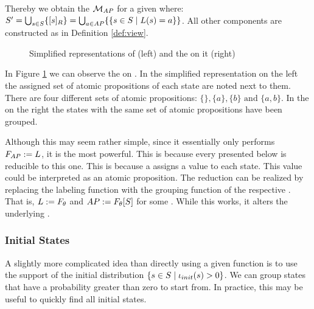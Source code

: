 \documentclass[preview]{standalone}
\begin{document}
Thereby we obtain the \viewN ${{{{{\mathcal{M}}}}_{{{AP}}}}}$ for a given \chgphN \chgph where: ${S}' = \bigcup_{{s} \in {S}} \{{{[{s}]_{{R}}}}\} = \bigcup_{a \in {AP}} \{\{{s} \in {S} \mid {L}({s}) = a\}\}$. All other components are constructed as in Definition \ref{def:view}.

\begin{figure}[!htb]
	\begin{minipage}{.6\textwidth}
		
	\end{minipage}%
	\begin{minipage}{.5\textwidth}
		
	\end{minipage}
	\caption{Simplified representations of \mdp (left) and the \viewN \viewatomicprops on it (right)}
	\label{fig:apIdentBeforeAfter} 
\end{figure}

\begin{exmp}
	In Figure \ref{fig:apIdentBeforeAfter} we can observe the \viewN \viewatomicprops on \chgph. In the simplified representation on the left the assigned set of atomic propositions of each state are noted next to them. There are four different sets of atomic propositions: $\{\}, \{a\}, \{b\} \text{ and } \{a,b\}$. In the \viewN on the right the states with the same set of atomic propositions have been grouped.
\end{exmp}

Although this \viewN may seem rather simple, since it essentially only performs ${{F_{{{AP}}}}} := {L}$, it is the most powerful. This is because every \viewN presented below is reducible to this one. This is because a \grpfctN assigns a value to each state. This value could be interpreted as an atomic proposition. The reduction can be realized by replacing the labeling function with the grouping function of the respective \viewN. That is, ${L} := {F_{{\theta}}}$ and ${AP} := {{F_{{\theta}}}}[{S}]$ for some \grpfctN \grpfct. While this works, it alters the underlying \chgphN.

\subsubsection{Initial States}
A slightly more complicated idea than directly using a given function is to use the support of the initial distribution $\{{s} \in {S} \mid {\iota_{init}}({s}) > 0\}$. We can group states that have a probability greater than zero to start from. In practice, this may be useful to quickly find all initial states.
\end{document}
